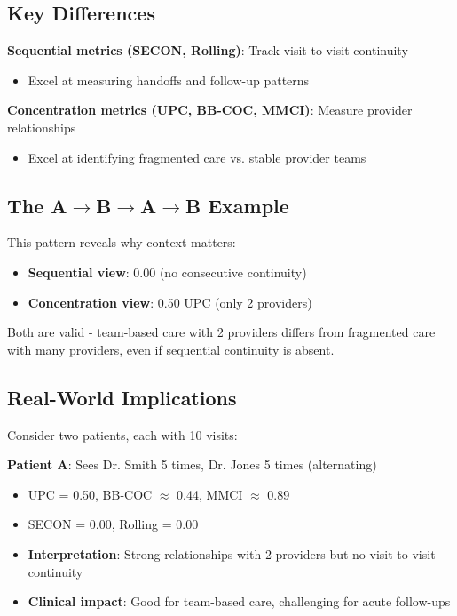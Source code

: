 \documentclass[11pt,a4paper]{article}
\begin{document}
\subsection{Key Differences}

\textbf{Sequential metrics (SECON, Rolling)}: Track visit-to-visit continuity
\begin{itemize}
\item Excel at measuring handoffs and follow-up patterns
\end{itemize}

\textbf{Concentration metrics (UPC, BB-COC, MMCI)}: Measure provider relationships
\begin{itemize}
\item Excel at identifying fragmented care vs. stable provider teams
\end{itemize}

\subsection{The A$\rightarrow$B$\rightarrow$A$\rightarrow$B Example}

This pattern reveals why context matters:
\begin{itemize}
\item \textbf{Sequential view}: 0.00 (no consecutive continuity)
\item \textbf{Concentration view}: 0.50 UPC (only 2 providers)
\end{itemize}

Both are valid - team-based care with 2 providers differs from fragmented care with many providers, even if sequential continuity is absent.

\subsection{Real-World Implications}

Consider two patients, each with 10 visits:

\textbf{Patient A}: Sees Dr. Smith 5 times, Dr. Jones 5 times (alternating)
\begin{itemize}
\item UPC = 0.50, BB-COC $\approx$ 0.44, MMCI $\approx$ 0.89
\item SECON = 0.00, Rolling = 0.00
\item \textbf{Interpretation}: Strong relationships with 2 providers but no visit-to-visit continuity
\item \textbf{Clinical impact}: Good for team-based care, challenging for acute follow-ups
\end{itemize}
\end{document}
